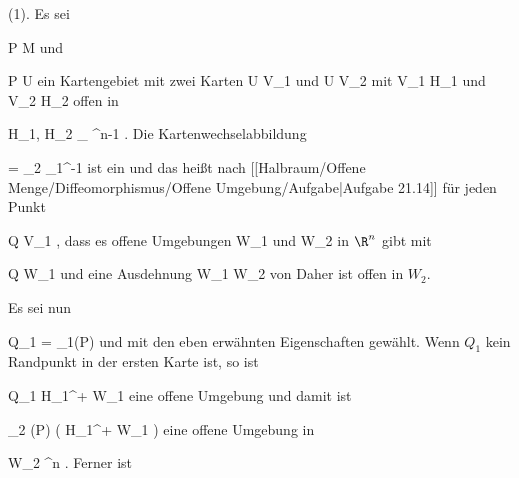 {

\teilbeweis {}{}{}
{(1). Es sei

\mavergleichskette
{\vergleichskette
{ P
}
{ \in }{ M
}
{  }{
}
{    }{
}
{   }{
}
}
{}{}{}
und

\mavergleichskette
{\vergleichskette
{ P
}
{ \in }{ U
}
{  }{
}
{    }{
}
{   }{
}
}
{}{}{}
ein Kartengebiet mit zwei Karten
 { U } { V_1
} {}
und
 { U } { V_2
} {}
mit
\mathkor {} {V_1 \subseteq H_1} {und} {V_2 \subseteq H_2} {}
offen in

\mavergleichskette
{\vergleichskette
{ H_1, H_2
}
{ \cong }{ \R_{} \times \R^{n-1}
}
{  }{
}
{    }{
}
{   }{
}
}
{}{}{.}
Die Kartenwechselabbildung

\mavergleichskette
{\vergleichskette
{ \varphi
}
{ = }{ \alpha_2 \circ \alpha_1^{-1}
}
{  }{
}
{    }{
}
{   }{
}
}
{}{}{}
ist ein
und das heißt
nach [[Halbraum/Offene Menge/Diffeomorphismus/Offene Umgebung/Aufgabe|Aufgabe 21.14]]
für jeden Punkt

\mavergleichskette
{\vergleichskette
{ Q
}
{ \in }{ V_1
}
{  }{
}
{    }{
}
{   }{
}
}
{}{}{,}
dass es offene Umgebungen
\mathkor {} {W_1} {und} {W_2} {}
in $\R^n$ gibt mit

\mavergleichskette
{\vergleichskette
{ Q
}
{ \in }{ W_1
}
{  }{
}
{    }{
}
{   }{
}
}
{}{}{}
und eine
Ausdehnung
\maabbdisp {\tilde{\varphi}} {W_1 } { W_2
} {}
von
 Daher ist
 offen in $W_2$.

Es sei nun

\mavergleichskette
{\vergleichskette
{ Q_1
}
{ = }{ \alpha_1(P)
}
{  }{
}
{    }{
}
{   }{
}
}
{}{}{}
und
 mit den eben erwähnten Eigenschaften gewählt. Wenn $Q_1$ kein Randpunkt in der ersten Karte ist, so ist

\mavergleichskette
{\vergleichskette
{ Q_1
}
{ \in }{ H_1^+ \cap W_1
}
{  }{
}
{    }{
}
{   }{
}
}
{}{}{}
eine offene Umgebung und damit ist

\mavergleichskette
{\vergleichskette
{ \alpha_2 (P)
}
{ \in }{ \tilde{\varphi} \left(  H_1^+ \cap W_1  \right)
}
{  }{
}
{    }{
}
{   }{
}
}
{}{}{}
eine offene Umgebung in

\mavergleichskette
{\vergleichskette
{ W_2
}
{ \subseteq }{ \R^n
}
{  }{
}
{    }{
}
{   }{
}
}
{}{}{.}
Ferner ist

}}
